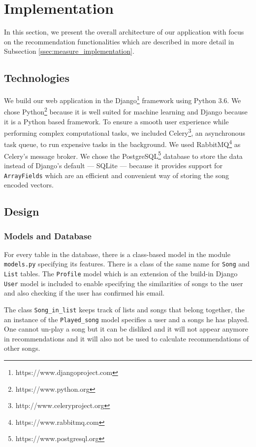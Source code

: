\section{Implementation}\label{sec:implementation}
In this section, we present the overall architecture of our application with focus on the recommendation functionalities which are described in more detail in Subsection \ref{ssec:measure_implementation}. 

\subsection{Technologies}

We build our web application in the Django\footnote{https://www.djangoproject.com} framework using Python 3.6. We chose Python\footnote{https://www.python.org} because it is well suited for machine learning and Django because it is a Python based framework. To ensure a smooth user experience while performing complex computational tasks, we included Celery\footnote{http://www.celeryproject.org}, an asynchronous task queue, to run expensive tasks in the background. We used RabbitMQ\footnote{https://www.rabbitmq.com} as Celery's message broker. We chose the PostgreSQL\footnote{https://www.postgresql.org} database to store the data instead of Django's default --- SQLite --- because it provides support for \texttt{ArrayFields} which are an efficient and convenient way of storing the song encoded vectors.

\subsection{Design}

\subsubsection{Models and Database}
For every table in the database, there is a class-based model in the module \texttt{models.py} specifying its features. There is a class of the same name for \texttt{Song} and \texttt{List} tables. The \texttt{Profile} model which is an extension of the build-in Django \texttt{User} model is included to enable specifying the similarities of songs to the user and also checking if the user has confirmed his email.
 
The class \texttt{Song\_in\_list} keeps track of lists and songs that belong together, the an instance of the \texttt{Played\_song} model specifies a user and a songs he has played. One cannot un-play a song but it can be disliked and it will not appear anymore in recommendations and it will also not be used to calculate recommendations of other songs. 

